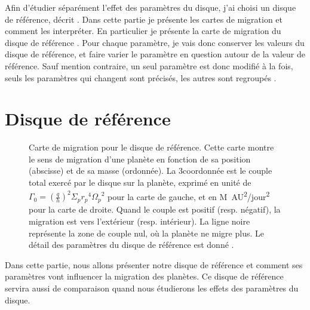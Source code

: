 Afin d'étudier séparément l'effet des paramètres du disque, j'ai choisi un disque de référence, décrit
. Dans cette partie je présente les cartes de migration et comment les interpréter. En particulier
je présente la carte de migration du disque de référence . Pour chaque paramètre, je vais
donc conserver les valeurs du disque de référence, et faire varier le paramètre en question autour de la valeur de référence. Sauf
mention contraire, un seul paramètre est donc modifié à la fois, seuls les paramètres qui changent sont précisés, les autres
sont regroupés .

\section{Disque de référence}\label{sec:migrations-maps}\label{sec:reference_disk}

\begin{figure}[htbp]
\centering
{}\hfill
{}

\caption{Carte de migration pour le disque de référence. Cette carte montre le sens de migration d'une planète en fonction de sa
position (abscisse) et de sa masse (ordonnée). La 3\ieme coordonnée est le couple total exercé par le disque sur la planète,
exprimé en unité de $\Gamma_0 = \left(\frac{q}{h}\right)^2\Sigma_p {r_p}^4 {\Omega_p}^2$ pour la carte de gauche, et en \unit{M_\odot AU^2/jour^2} pour la carte de droite. Quand le couple est positif (resp.
négatif), la migration est vers l'extérieur (resp. intérieur). La ligne noire représente la zone de couple nul, où la planète ne
migre plus. Le détail des paramètres du disque de référence est donné .
}\label{fig:fiducial_migration_map}
\end{figure}

Dans cette partie, nous allons présenter notre disque de référence et comment ses paramètres vont influencer la migration des
planètes. Ce disque de référence servira aussi de comparaison quand nous étudierons les effets des paramètres du disque.

